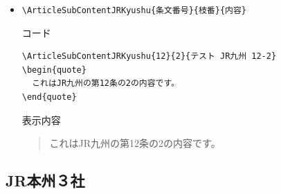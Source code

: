 \documentclass[oneside,10pt,a4paper]{jsarticle}
\begin{document}
\begin{itemize}
\begin{itembox}[l]{表示内容}
\begin{quote}
        \end{quote}
      \end{itembox}
    \item \verb|\ArticleSubContentJRKyushu{条文番号}{枝番}{内容}|
      \begin{itembox}[l]{コード}
        \begin{verbatim}
\ArticleSubContentJRKyushu{12}{2}{テスト JR九州 12-2}
\begin{quote}
  これはJR九州の第12条の2の内容です。
\end{quote}\end{verbatim}
      \end{itembox}
      \begin{itembox}[l]{表示内容}
        \begin{quote}
          これはJR九州の第12条の2の内容です。
        \end{quote}
      \end{itembox}
  \end{itemize}

  \newpage

  \subsection{JR本州３社}
\end{document}
